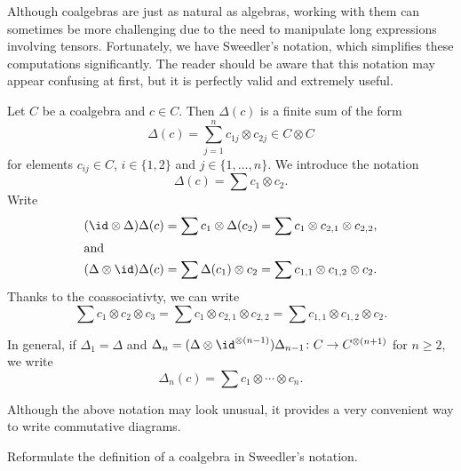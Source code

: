 \documentclass[12pt]{amsproc}
\begin{document}
Although coalgebras are just as natural as algebras, working with them can sometimes be more challenging due to the need to manipulate long expressions involving tensors. Fortunately, we have Sweedler's notation, which simplifies these computations significantly. The reader should be aware that this notation may appear confusing at first, but it is perfectly valid and extremely useful.

Let $C$ be a coalgebra and $c\in C$. Then $\Delta(c)$ is
a finite sum of the form 
\[
\Delta(c)=\sum_{j=1}^n c_{1j}\otimes c_{2j}\in C\otimes C
\]
for elements $c_{ij}\in C$, $i\in\{1,2\}$ 
and $j\in\{1,\dots,n\}$. We introduce the notation 
\[
\Delta(c)=\sum c_{1}\otimes c_{2}.
\]
Write 
\begin{align*}
(\id\otimes\Delta)\Delta(c)&=\sum c_1\otimes\Delta(c_2)=\sum c_1\otimes c_{2,1}\otimes c_{2,2},\\
\shortintertext{and}
(\Delta\otimes\id)\Delta(c)&=\sum\Delta(c_1)\otimes c_2
    =\sum c_{1,1}\otimes c_{1,2}\otimes c_{2}. 
\end{align*}
Thanks to the coassociativty, we can write 
\[
\sum c_{1}\otimes c_{2}\otimes c_{3}
=\sum c_1\otimes c_{2,1}\otimes c_{2,2}
=\sum c_{1,1}\otimes c_{1,2}\otimes c_{2}.
\]

In general, if $\Delta_1=\Delta$ and 
$\Delta_n=(\Delta\otimes\id^{\otimes(n-1)})\Delta_{n-1}\colon C\to C^{\otimes(n+1)}$ for $n\geq2$, 
we write 
\[
\Delta_n(c)=\sum c_{1}\otimes\cdots\otimes c_{n}.
\]

Although the above notation may look unusual, it provides a very convenient way to write commutative diagrams. 

\begin{exercise}
\label{xca:Hopf}
    Reformulate the definition of a coalgebra in Sweedler’s notation.
\end{exercise}
\end{document}
